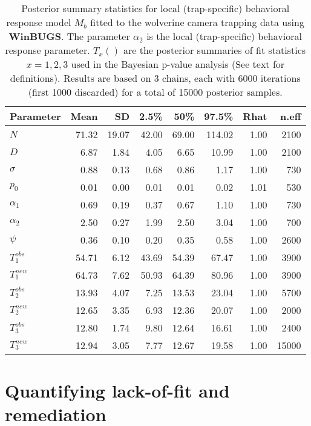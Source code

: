 \begin{table}[ht]
\centering
\caption{
Posterior summary statistics for local (trap-specific) behavioral
response model $M_{b}$ fitted to the wolverine camera trapping data
using {\bf WinBUGS}. The parameter $\alpha_{2}$ is the local
(trap-specific) behavioral
response parameter. $T_{x}()$ are the posterior summaries of fit
statistics $x=1,2,3$ used in the Bayesian p-value analysis (See text for
definitions). Results are based on
 3 chains, each with 6000 iterations (first 1000 discarded) for a
 total of 15000 posterior samples. 
}
\begin{tabular}{lrrrrrrr} \hline \hline 
Parameter   & Mean  & SD  & 2.5\% & 50\% & 97.5\% & Rhat &n.eff \\ \hline
$N$          & 71.32 &19.07 &42.00 &69.00 &114.02 &1.00  &2100 \\
$D$          &  6.87 & 1.84 & 4.05 & 6.65 & 10.99 &1.00  &2100\\ \hline
$\sigma$    &  0.88 & 0.13 & 0.68 & 0.86 & 1.17  &1.00  & 730 \\
$p_0$        &  0.01 & 0.00 & 0.01 & 0.01 & 0.02  &1.01  & 530\\
$\alpha_1$   &  0.69 & 0.19 & 0.37 & 0.67 &  1.10 &1.00  & 730\\
$\alpha_2$   &  2.50 & 0.27 & 1.99 & 2.50 &  3.04 &1.00  & 700\\
$\psi$       &  0.36 & 0.10 & 0.20 & 0.35 & 0.58  &1.00  &2600  \\
$T_{1}^{obs}$  & 54.71 & 6.12 &43.69 &54.39 & 67.47 &1.00  &3900\\
$T_{1}^{new}$  & 64.73 & 7.62 &50.93 &64.39 & 80.96 &1.00  &3900\\
$T_{2}^{obs}$  & 13.93 & 4.07 & 7.25 &13.53 & 23.04 &1.00  &5700\\
$T_{2}^{new}$  & 12.65 & 3.35 & 6.93 &12.36 & 20.07 &1.00  &2000\\
$T_{3}^{obs}$  & 12.80 & 1.74 & 9.80 &12.64 & 16.61 &1.00  &2400\\
$T_{3}^{new}$  & 12.94 & 3.05 & 7.77 &12.67 & 19.58 &1.00 &15000\\ \hline
\end{tabular}
\label{gof.tab.wolvMb}
\end{table}

\section{Quantifying lack-of-fit and remediation}

